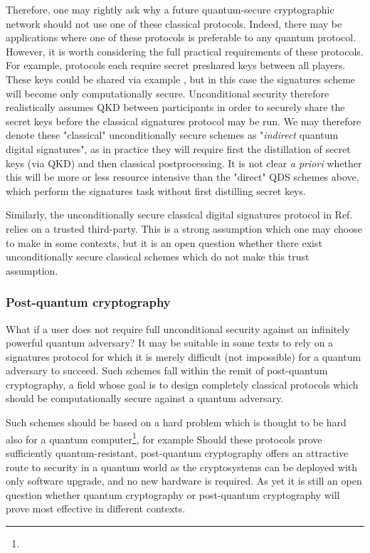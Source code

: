 Therefore, one may rightly ask why a future quantum-secure cryptographic network should not use one of these classical protocols. Indeed, there may be applications where one of these protocols is preferable to any quantum protocol. However, it is worth considering the full practical requirements of these protocols. For example, protocols \cite{Wallden2015, Amiri2016a} each require secret preshared keys between all players. These keys could be shared via example , but in this case the signatures scheme will become only computationally secure. Unconditional security therefore realistically assumes QKD between participants in order to securely share the secret keys before the classical signatures protocol may be run. We may therefore denote these "classical" unconditionally secure schemes as "\emph{indirect} quantum digital signatures", as in practice they will require first the distillation of secret keys (via QKD) and then classical postprocessing. It is not clear \emph{a priori} whether this will be more or less resource intensive than the "direct" QDS schemes above, which perform the signatures task without first distilling secret keys.

Similarly, the unconditionally secure classical digital signatures protocol in Ref.~ relies on a trusted third-party. This is a strong assumption which one may choose to make in some contexts, but it is an open question whether there exist unconditionally secure classical schemes which do not make this trust assumption.

\subsubsection*{Post-quantum cryptography}
What if a user does not require full unconditional security against an infinitely powerful quantum adversary? It may be suitable in some texts to rely on a signatures protocol for which it is merely difficult (not impossible) for a quantum adversary to succeed. Such schemes fall within the remit of post-quantum cryptography, a field whose goal is to design completely classical protocols which should be computationally secure against a quantum adversary. 

Such schemes should be based on a hard problem which is thought to be hard also for a quantum computer\footnote{}, for example  Should these protocols prove sufficiently quantum-resistant, post-quantum cryptography offers an attractive route to security in a quantum world as the cryptosystems can be deployed with only software upgrade, and no new hardware is required.  As yet it is still an open question whether quantum cryptography or post-quantum cryptography will prove most effective in different contexts.

